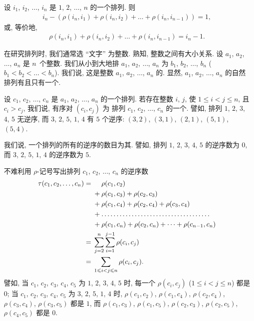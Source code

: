 \documentclass[%
    UTF8,%
    fontset=none,%
    punct=kaiming,%
    zihao=-4,%
    a4paper,%
    oneside,%
]{ctexbook}
\let\emph\relax
\renewcommand*{\leq}{\leqslant}
\begin{document}
\begin{theorem}
    设 \(i_1\), \(i_2\), \(\dots\), \(i_n\) 是
    \(1\), \(2\), \(\dots\), \(n\) 的一个排列.
    则
    \begin{align*}
        i_n - (\rho(i_n, i_1) + \rho(i_n, i_2)
        + \dots + \rho(i_n, i_{n-1})) = 1,
    \end{align*}
    或, 等价地,
    \begin{align*}
        \rho(i_n, i_1) + \rho(i_n, i_2)
        + \dots + \rho(i_n, i_{n-1}) = i_n - 1.
    \end{align*}
\end{theorem}

在研究排列时, 我们通常选 ``文字'' 为整数.
熟知, 整数之间有大小关系.
设 \(a_1\), \(a_2\), \(\dots\), \(a_n\) 是%
\emph{互不相同的} \(n\)~个整数.
我们从小到大地排
\(a_1\), \(a_2\), \(\dots\), \(a_n\)
为
\(b_1\), \(b_2\), \(\dots\), \(b_n\)
(\(b_1 < b_2 < \dots < b_n\)).
我们说, 这是整数 \(a_1\), \(a_2\), \(\dots\), \(a_n\)
的\emph{自然排列}.
显然, \(a_1\), \(a_2\), \(\dots\), \(a_n\)
的自然排列有且只有一个.

设
\(c_1\), \(c_2\), \(\dots\), \(c_n\)
是 \(a_1\), \(a_2\), \(\dots\), \(a_n\) 的一个排列.
若存在整数 \(i\), \(j\),
使 \(1 \leq i < j \leq n\),
且 \(c_i > c_j\),
我们说, 有序对 \((c_i, c_j)\) 为%
排列 \(c_1\), \(c_2\), \(\dots\), \(c_n\)
的一个\emph{逆序}.
譬如, 排列 \(1\), \(2\), \(3\), \(4\), \(5\) 无逆序,
而 \(3\), \(2\), \(5\), \(1\), \(4\) 有 \(5\) 个逆序:
\((3, 2)\), \((3, 1)\), \((2, 1)\), \((5, 1)\), \((5, 4)\).

我们说, 一个排列的所有的逆序的数目为其\emph{逆序数}.
譬如, 排列 \(1\), \(2\), \(3\), \(4\), \(5\) 的逆序数为 \(0\),
而 \(3\), \(2\), \(5\), \(1\), \(4\) 的逆序数为 \(5\).

不难利用 \(\rho\)-记号写出排列
\(c_1\), \(c_2\), \(\dots\), \(c_n\)
的逆序数
\begin{align*}
    \tau(c_1, c_2, \dots, c_n)
    = {} & \hphantom{{} + {}} \rho(c_1, c_2)
    \\
         & + \rho(c_1, c_3) + \rho(c_2, c_3)
    \\
         & + \rho(c_1, c_4) + \rho(c_2, c_4)
    + \rho(c_3, c_4)
    \\
         & +
    \dots \dots \dots \dots
    \dots \dots \dots \dots
    \dots \dots \dots \dots
    \\
         & + \rho(c_1, c_n) + \rho(c_2, c_n) + \dots
    + \rho(c_{n-1}, c_n)
    \\
    = {} & \sum_{j = 2}^{n} {
    \sum_{i = 1}^{j - 1} {\rho(c_i, c_j)} }
    \\
    = {} & \sum_{1 \leq i < j \leq n} {\rho(c_i, c_j)}.
\end{align*}
譬如, 当 \(c_1\), \(c_2\), \(c_3\), \(c_4\), \(c_5\) 为
\(1\), \(2\), \(3\), \(4\), \(5\) 时,
每一个 \(\rho(c_i, c_j)\) (\(1 \leq i < j \leq n\)) 都是 \(0\);
当 \(c_1\), \(c_2\), \(c_3\), \(c_4\), \(c_5\) 为
\(3\), \(2\), \(5\), \(1\), \(4\) 时,
\(\rho(c_1, c_2)\), \(\rho(c_1, c_4)\),
\(\rho(c_2, c_4)\),
\(\rho(c_3, c_4)\), \(\rho(c_3, c_5)\)
都是 \(1\),
而
\(\rho(c_1, c_3)\), \(\rho(c_1, c_5)\),
\(\rho(c_2, c_3)\), \(\rho(c_2, c_5)\),
\(\rho(c_4, c_5)\)
都是 \(0\).
\end{document}
